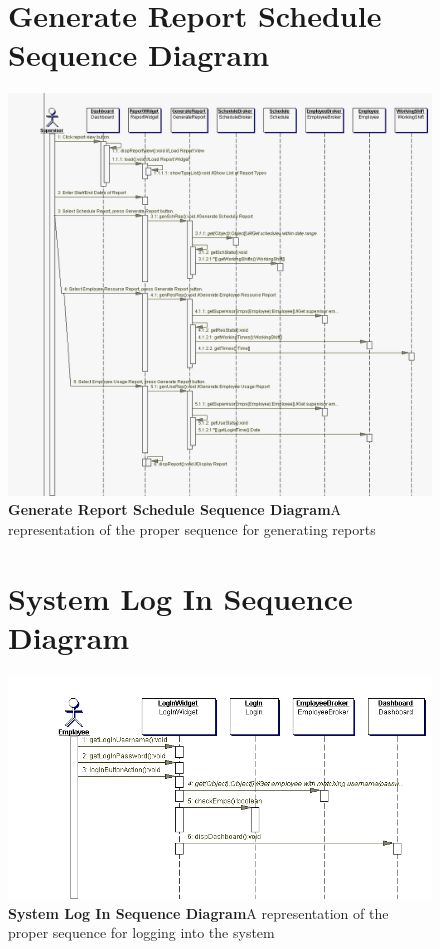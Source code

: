 \documentclass[letterpaper,12pt]{report}
\begin{document}
\begin{figure}[hbp]
 \section{Generate Report Schedule Sequence Diagram}
 \includegraphics[scale=0.5]{externals/GenerateReportSequence.png}
 \caption{\small
\textbf{Generate Report Schedule Sequence Diagram}\newline A representation of the proper sequence for generating reports}\label{fig:seqGenReport}
\end{figure}
\newpage
\begin{figure}[hbp]
 \section{System Log In Sequence Diagram}
 \includegraphics[scale=0.8]{externals/LogInSequence.png}
 \caption{\small
\textbf{System Log In Sequence Diagram}\newline A representation of the proper sequence for logging into the system}\label{fig:seqLogInSys}
\end{figure}
\end{document}
